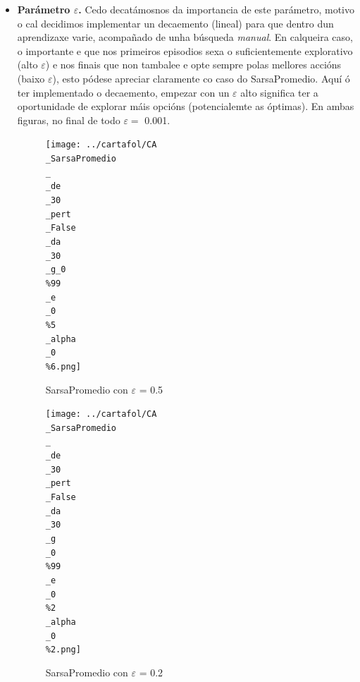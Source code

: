 \documentclass{article}
\begin{document}
\begin{itemize}
	\item \textbf{Parámetro $\varepsilon$.} Cedo decatámosnos da importancia de este parámetro, motivo o cal decidimos implementar un decaemento (lineal) para que dentro dun aprendizaxe varie, acompañado de unha búsqueda \emph{manual}. En calqueira caso, o importante e que nos primeiros episodios sexa o suficientemente explorativo (alto $\varepsilon$) e nos finais que non tambalee e opte sempre polas mellores accións (baixo $\varepsilon$), esto pódese apreciar claramente co caso do SarsaPromedio. Aquí ó ter implementado o decaemento, empezar con un $\varepsilon$ alto significa ter a oportunidade de explorar máis opcións (potencialemte as óptimas). En ambas figuras, no final de todo $\varepsilon =$ 0.001.

		\begin{figure}[htbp]
    \centering
    \begin{minipage}{0.45\textwidth}
        \centering
        \texttt{[image: ../cartafol/CA\\\_SarsaPromedio\\\_\\\_de\\\_30\\\_pert\\\_False\\\_da\\\_30\\\_g\_0\\\%99\\\_e\\\_0\\\%5\\\_alpha\\\_0\\\%6.png]}
\caption*{SarsaPromedio con $\varepsilon$ = 0.5}

    \end{minipage}
    \hfill
    \begin{minipage}{0.45\textwidth}
        \centering
        \texttt{[image: ../cartafol/CA\\\_SarsaPromedio\\\_\\\_de\\\_30\\\_pert\\\_False\\\_da\\\_30\\\_g\\\_0\\\%99\\\_e\\\_0\\\%2\\\_alpha\\\_0\\\%2.png]}
\caption*{SarsaPromedio con $\varepsilon$ = 0.2}


\end{minipage}
\end{figure}
\end{itemize}
\end{document}

